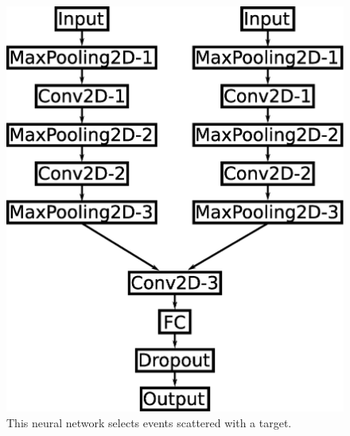 \documentclass{jps-cp}
\begin{document}
\vspace{-2zw}
\begin{figure}
  \centering
  \begin{minipage}{0.4\columnwidth}
    \centering
    \includegraphics[clip, width=0.9\columnwidth]{eps/event_selection.eps}
    \caption{This neural network selects events scattered with a target.}
    \label{fig:selection}
  \end{minipage}
  \hfill
  \begin{minipage}{0.4\columnwidth}
    \centering

\end{minipage}
\end{figure}
\end{document}

